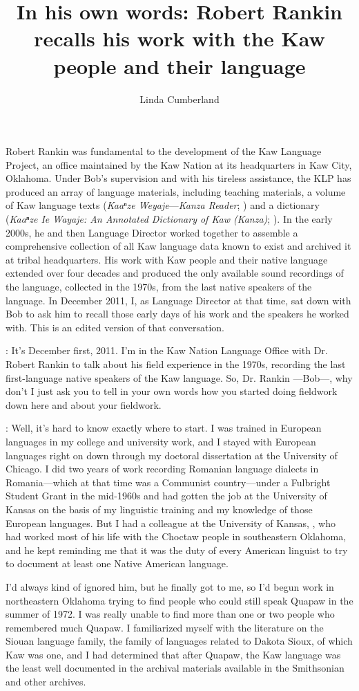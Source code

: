 \documentclass[output=paper]{LSP/langsci}
\author{Linda Cumberland}
\title{In his own words: Robert Rankin recalls his work with the Kaw people and their language}
\begin{document}
Robert Rankin was fundamental to the development of the Kaw Language Project, an office maintained by the Kaw Nation at its headquarters in Kaw City, Oklahoma. Under Bob's supervision and with his tireless assistance, the KLP has produced an array of language materials, including teaching materials, a volume of Kaw language texts (\textit{Kaaⁿze Weyaje}---\textit{Kanza Reader}; \citealt{McBrideEtAl2010}) and a dictionary (\textit{Kaaⁿze Ie Wayaje: An Annotated Dictionary of Kaw (Kanza)}; \citealt{CumberlandEtAl2012}). In the early 2000s, he and then Language Director  worked together to assemble a comprehensive collection of all Kaw language data known to exist and archived it at tribal headquarters. His work with Kaw people and their native language extended over four decades and produced the only available sound recordings of the language, collected in the 1970s, from the last native speakers of the language. In December 2011, I, as Language Director at that time, sat down with Bob to ask him to recall those early days of his work and the speakers he worked with. This is an edited version of that conversation.

: It's December first, 2011. I'm in the Kaw Nation Language Office with Dr. Robert Rankin to talk about his field experience in the 1970s, recording the last first-language native speakers of the Kaw language. So, Dr. Rankin ---Bob---, why don't I just ask you to tell in your own words how you started doing fieldwork down here and about your fieldwork.

:  Well, it's hard to know exactly where to start. I was trained in European languages in my college and university work, and I stayed with European languages right on down through my doctoral dissertation at the University of Chicago. I did two years of work recording Romanian language dialects in Romania---which at that time was a Communist country---under a Fulbright Student Grant in the mid-1960s and had gotten the job at the University of Kansas on the basis of my linguistic training and my knowledge of those European languages. But I had a colleague at the University of Kansas, , who had worked most of his life with the Choctaw people in southeastern Oklahoma, and he kept reminding me that it was the duty of every American linguist to try to document at least one Native American language. 

I'd always kind of ignored him, but he finally got to me, so I'd begun work in northeastern Oklahoma trying to find people who could still speak Quapaw in the summer of 1972. I was really unable to find more than one or two people who remembered much Quapaw. I familiarized myself with the literature on the Siouan language family, the family of languages related to Dakota Sioux, of which Kaw was one, and I had determined that after Quapaw, the Kaw language was the least well documented in the archival materials available in the Smithsonian and other archives. 
\end{document}
